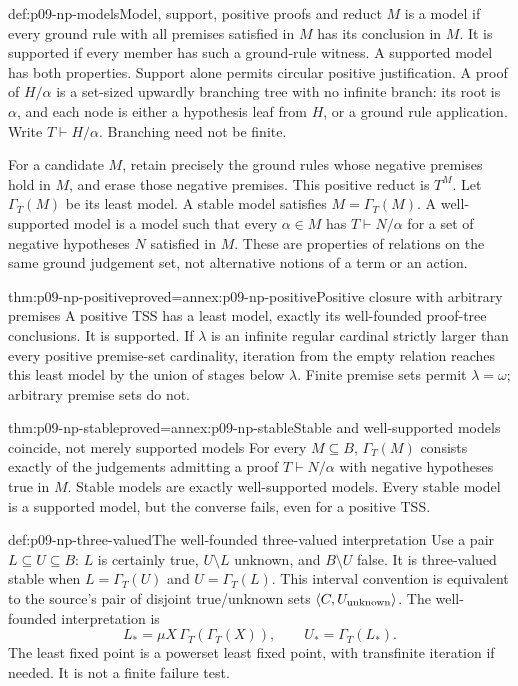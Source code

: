 \begin{hbdefinition}{def:p09-np-models}{Model, support, positive proofs and reduct}
\(M\) is a model if every ground rule with all premises satisfied
in \(M\) has its conclusion in \(M\). It is supported if every
member has such a ground-rule witness. A supported model has both
properties. Support alone permits circular positive justification.
A proof of \(H/\alpha\) is a set-sized upwardly branching tree
with no infinite branch: its root is \(\alpha\), and each node
is either a hypothesis leaf from \(H\), or a ground rule application.
Write \(T\vdash H/\alpha\). Branching need not be finite.

For a candidate \(M\), retain precisely the ground rules whose
negative premises hold in \(M\), and erase those negative premises.
This positive reduct is \(T^M\). Let \(\Gamma_T(M)\) be its
least model. A stable model satisfies \(M=\Gamma_T(M)\).
A well-supported model is a model such that every \(\alpha\in M\)
has \(T\vdash N/\alpha\) for a set of negative hypotheses \(N\)
satisfied in \(M\). These are properties of relations on the same
ground judgement set, not alternative notions of a term or an action.
\end{hbdefinition}

\begin{hblemma}{thm:p09-np-positive}{proved=annex:p09-np-positive}{Positive closure with arbitrary premises}
A positive TSS has a least model, exactly its well-founded proof-tree
conclusions. It is supported. If \(\lambda\) is an infinite regular
cardinal strictly larger than every positive premise-set cardinality,
iteration from the empty relation reaches this least model by the
union of stages below \(\lambda\). Finite premise sets permit
\(\lambda=\omega\); arbitrary premise sets do not.
\end{hblemma}

\begin{hblemma}{thm:p09-np-stable}{proved=annex:p09-np-stable}{Stable and well-supported models coincide, not merely supported models}
For every \(M\subseteq B\), \(\Gamma_T(M)\) consists exactly
of the judgements admitting a proof \(T\vdash N/\alpha\) with
negative hypotheses true in \(M\). Stable models are exactly
well-supported models. Every stable model is a supported model,
but the converse fails, even for a positive TSS.
\end{hblemma}

\begin{hbdefinition}{def:p09-np-three-valued}{The well-founded three-valued interpretation}
Use a pair \(L\subseteq U\subseteq B\): \(L\) is certainly
true, \(U\setminus L\) unknown, and \(B\setminus U\) false.
It is three-valued stable when
\(L=\Gamma_T(U)\) and \(U=\Gamma_T(L)\).
This interval convention is equivalent to the source's pair of
disjoint true/unknown sets \(\langle C,U_{\rm unknown}\rangle\).
The well-founded interpretation is
\[
 L_* = \mu X\,\Gamma_T(\Gamma_T(X)),\qquad
 U_* = \Gamma_T(L_*).
\]
The least fixed point is a powerset least fixed point, with transfinite
iteration if needed. It is not a finite failure test.
\end{hbdefinition}

